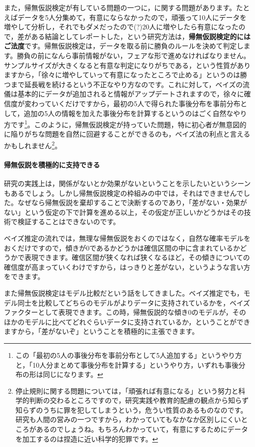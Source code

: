 \documentclass{ltjbook}
\begin{document}
また，帰無仮説検定が有している問題の一つに，に関する問題があります。たとえばデータを5人分集めて，有意にならなかったので，頑張って10人にデータを増やして分析し，それでもダメだったので(?)20人に増やしたら有意になったので，差がある結論としてレポートした，という研究方法は，\textbf{帰無仮説検定的にはご法度}です。帰無仮説検定は，データを取る前に勝負のルールを決めて判定します。勝負の前になんら事前情報がない，フェアな形で進めなければなりません。サンプルサイズが大きくなると有意な判定になりがちである，という性質がありますから，「徐々に増やしていって有意になったところで止める」というのは勝つまで延長戦を続けるという不正なやり方なのです。これに対して，ベイズの流儀は基本的にデータが追加されると情報がアップデートされますので，徐々に確信度が変わっていくだけですから，最初の5人で得られた事後分布を事前分布として，追加の5人の情報を加えた事後分布を計算するというのはごく自然なやり方です\footnote{この「最初の5人の事後分布を事前分布として5人追加する」というやり方と，「10人分まとめて事後分布を計算する」というやり方，いずれも事後分布の形は同じになります。}。このように，帰無仮説検定が持っていた問題，特に初心者が無意図的に陥りがちな問題を自然に回避することができるのも，ベイズ法の利点と言えるかもしれません\footnote{停止規則に関する問題については，「頑張れば有意になる」という努力と科学的判断の交わるところですので，研究実践や教育的配慮の観点から知らず知らずのうちに罪を犯してしまうという，危うい性質のあるものなのです。研究も人間の営みの一つですから，わかっていてもなかなか区別しにくいところがあるのでしょうね。もちろんわかっていて，有意にするためにデータを加工するのは捏造に近い科学的犯罪です。}。

\paragraph{帰無仮説を積極的に支持できる}
研究の実践上は，関係がないとか効果がないということを示したいというシーンもあるでしょう。しかし帰無仮説検定の枠組みの中では，それはできませんでした。なぜなら帰無仮説を棄却することで決断するのであり，「差がない・効果がない」という仮定の下で計算を進める以上，その仮定が正しいかどうかはその技術で検証することはできないのです。

ベイズ推定の流れでは，無理な帰無仮説をおくのではなく，自然な確率モデルをおくだけですので，傾きが0であるかどうかは確信区間の中に含まれているかどうかで表現できます。確信区間が狭くなれば狭くなるほど，その傾きについての確信度が高まっていくわけですから，はっきりと差がない，というような言い方をできます。

また帰無仮説検定はモデル比較だという話をしてきました。ベイズ推定でも，モデル同士を比較してどちらのモデルがよりデータに支持されているかを，ベイズファクターとして表現できます。この時，帰無仮説的な傾き0のモデルが，そのほかのモデルに比べてどれぐらいデータに支持されているか，ということができますから，「差がないぞ」ということを積極的に主張できます。
\end{document}

